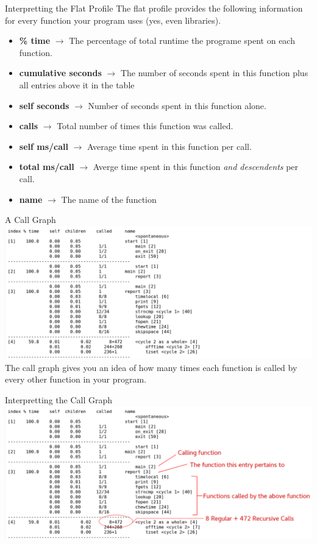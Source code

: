 \documentclass[11pt]{beamer}
\begin{document}
\begin{frame}{Interpretting the Flat Profile}
The flat profile provides the following information for every function your program uses (yes, even libraries).
\begin{itemize}
\item \textbf{\% time} $\rightarrow$ The percentage of total runtime the programe spent on each function.
\item \textbf{cumulative seconds} $\rightarrow$ The number of seconds spent in this function plus all entries above it in the table  
\item \textbf{self seconds} $\rightarrow$ Number of seconds spent in this function alone.
\item \textbf{calls} $\rightarrow$ Total number of times this function was called.
\item \textbf{self ms/call} $\rightarrow$ Average time spent in this function per call.
\item \textbf{total ms/call} $\rightarrow$ Averge time spent in this function \emph{and descendents} per call.
\item \textbf{name} $\rightarrow$ The name of the function
\end{itemize}
\end{frame}


\begin{frame}[fragile=singleslide]{A Call Graph}
\center
\includegraphics[scale=0.28]{CallGraph1.png}
\flushleft
The call graph gives you an idea of how many times each function is called by every other function in your program.  
\end{frame}


\begin{frame}{Interpretting the Call Graph}
\center
\includegraphics[scale=0.28]{CallGraph2.png}
\end{frame}
\end{document}
